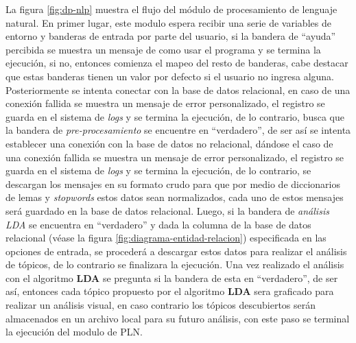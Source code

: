     La figura \ref{fig:dp-nlp} muestra el flujo del módulo de procesamiento de lenguaje natural. En primer lugar, este modulo espera recibir una serie de variables de entorno y banderas de entrada por parte del usuario, si la bandera de ``ayuda'' percibida se muestra un mensaje de como usar el programa y se termina la ejecución, si no, entonces comienza el mapeo del resto de banderas, cabe destacar que estas banderas tienen un valor por defecto si el usuario no ingresa alguna. Posteriormente se intenta conectar con la base de datos relacional, en caso de una conexión fallida se muestra un mensaje de error personalizado, el registro se guarda en el sistema de \textit{logs} y se termina la ejecución, de lo contrario, busca que la bandera de \textit{pre-procesamiento} se encuentre en ``verdadero'', de ser así se intenta establecer una conexión con la base de datos no relacional, dándose el caso de una conexión fallida se muestra un mensaje de error personalizado, el registro se guarda en el sistema de \textit{logs} y se termina la ejecución, de lo contrario, se descargan los mensajes en su formato crudo para que por medio de diccionarios de lemas y \textit{stopwords} estos datos sean normalizados, cada uno de estos mensajes será guardado en la base de datos relacional. Luego, si la bandera de \textit{análisis LDA} se encuentra en ``verdadero'' y dada la columna de la base de datos relacional (véase la figura \ref{fig:diagrama-entidad-relacion}) especificada en las opciones de entrada, se procederá a descargar estos datos para realizar el análisis de tópicos, de lo contrario se finalizara la ejecución. Una vez realizado el análisis con el algoritmo \textbf{LDA} se pregunta si la bandera de  esta en ``verdadero'', de ser así, entonces cada tópico propuesto por el algoritmo \textbf{LDA} sera graficado para realizar un análisis visual, en caso contrario los tópicos descubiertos serán almacenados en un archivo local para su futuro análisis, con este paso se terminal la ejecución del modulo de PLN.
